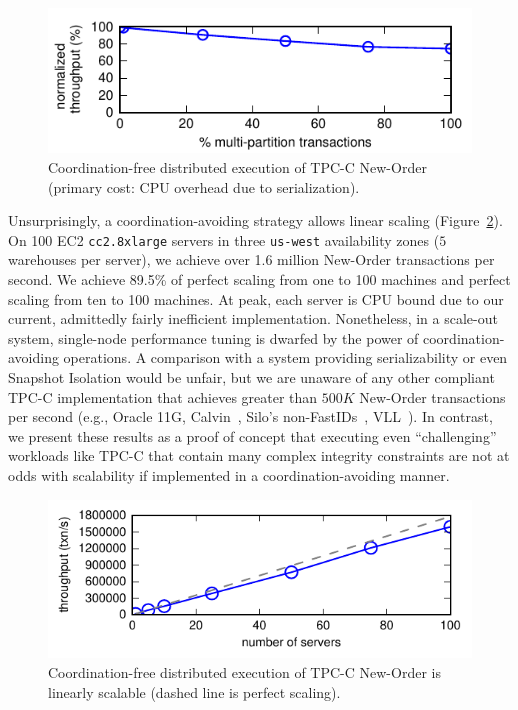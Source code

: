 \begin{figure}
\includegraphics[width=\columnwidth]{figs/pct_thru.pdf}\vspace{-1em}
\caption{Coordination-free distributed execution of TPC-C New-Order
  (primary cost: CPU overhead due to serialization).}
\label{fig:pct}
\end{figure}

Unsurprisingly, a coordination-avoiding strategy allows linear scaling
(Figure~\ref{fig:scaleout}). On 100 EC2 \texttt{cc2.8xlarge} servers
in three \texttt{us-west} availability zones ($5$ warehouses per
server), we achieve over 1.6 million New-Order transactions per
second. We achieve 89.5\% of perfect scaling from one to 100 machines
and perfect scaling from ten to 100 machines. At peak, each server is
CPU bound due to our current, admittedly fairly inefficient
implementation. Nonetheless, in a scale-out system, single-node
performance tuning is dwarfed by the power of coordination-avoiding
operations. A comparison with a system providing serializability or
even Snapshot Isolation would be unfair, but we are unaware of any
other compliant TPC-C implementation that achieves greater than $500K$
New-Order transactions per second (e.g., Oracle 11G,
Calvin~\cite{calvin}, Silo's non-FastIDs~\cite{silo},
VLL~\cite{abadi-vll}). In contrast, we present these results as a
proof of concept that executing even ``challenging'' workloads like
TPC-C that contain many complex integrity constraints are not at odds
with scalability if implemented in a coordination-avoiding manner.

\begin{figure}
\begin{center}
\includegraphics[width=\columnwidth]{figs/thru_scale.pdf}\vspace{-2em}
\end{center}
\caption{Coordination-free distributed execution of TPC-C New-Order is
  linearly scalable (dashed line is perfect scaling).}
\label{fig:scaleout}
\end{figure}

